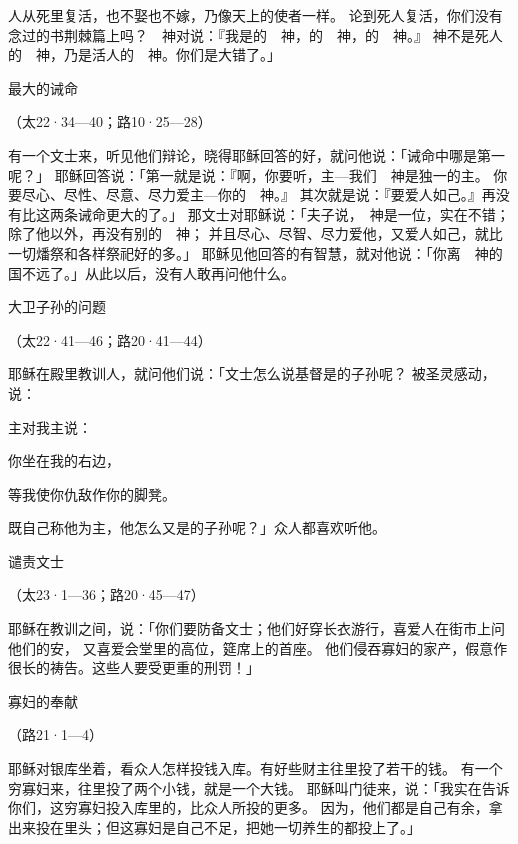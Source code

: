 {人从死里复活，也不娶也不嫁，乃像天上的使者一样。
论到死人复活，你们没有念过{}的书荆棘篇上{}吗？　神对{}说：『我是{}的　神，{}的　神，{}的　神。』
神不是死人的　神，乃是活人的　神。你们是大错了。」
\par }{\SH 最大的诫命
\par }{\R （太22·34—40；路10·25—28）
\par }{\PP {}有一个文士来，听见他们辩论，晓得耶稣回答的好，就问他说：「诫命中哪是第一{}呢？」
耶稣回答说：「第一{}就是说：『{}啊，你要听，主—我们　神是独一的主。
你要尽心、尽性、尽意、尽力爱主—你的　神。』
其次就是说：『要爱人如己。』再没有比这两条诫命更大的了。」
那文士对耶稣说：「夫子说，　神是一位，实在不错；除了他以外，再没有别的　神；
并且尽心、尽智、尽力爱他，又爱人如己，就比一切燔祭和各样祭祀好的多。」
耶稣见他回答的有智慧，就对他说：「你离　神的国不远了。」从此以后，没有人敢再问他什么。
\par }{\SH 大卫子孙的问题
\par }{\R （太22·41—46；路20·41—44）
\par }{\PP {}耶稣在殿里教训人，就问他们说：「文士怎么说基督是{}的子孙呢？
被圣灵感动，说：
\par }{\Q 主对我主说：
\par }{\Q 你坐在我的右边，
\par }{\Q 等我使你仇敌作你的脚凳。
\par }{\MM {}既自己称他为主，他怎么又是{}的子孙呢？」众人都喜欢听他。
\par }{\SH 谴责文士
\par }{\R （太23·1—36；路20·45—47）
\par }{\PP {}耶稣在教训之间，说：「你们要防备文士；他们好穿长衣游行，喜爱人在街市上问他们的安，
又喜爱会堂里的高位，筵席上的首座。
他们侵吞寡妇的家产，假意作很长的祷告。这些人要受更重的刑罚！」
\par }{\SH 寡妇的奉献
\par }{\R （路21·1—4）
\par }{\PP {}耶稣对银库坐着，看众人怎样投钱入库。有好些财主往里投了若干的钱。
有一个穷寡妇来，往里投了两个小钱，就是一个大钱。
耶稣叫门徒来，说：「我实在告诉你们，这穷寡妇投入库里的，比众人所投的更多。
因为，他们都是自己有余，拿出来投在里头；但这寡妇是自己不足，把她一切养生的都投上了。」

}
